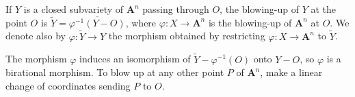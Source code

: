 If $Y$ is a closed subvariety of $\mathbf{A}^n$ passing through $O$, the blowing-up of $Y$ at the point $O$ is $\tilde{Y} = \overline{\varphi^{-1}(Y - O)}$, where $\varphi: X \to \mathbf{A}^n$ is the blowing-up of $\mathbf{A}^n$ at $O$. We denote also by $\varphi: \tilde{Y} \to Y$ the morphism obtained by restricting $\varphi: X \to \mathbf{A}^n$ to $\tilde{Y}$.

The morphism $\varphi$ induces an isomorphism of $\tilde{Y} - \varphi^{-1}(O)$ onto $Y - O$, so $\varphi$ is a birational morphism. To blow up at any other point $P$ of $\mathbf{A}^n$, make a linear change of coordinates sending $P$ to $O$.
